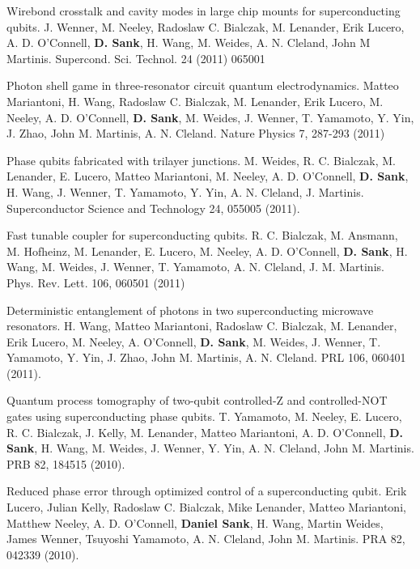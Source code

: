 \documentclass[margin=2cm,line]{res}
\newenvironment{list3}{
  \begin{list}{}{%
      \setlength{\itemsep}{0in}
      \setlength{\parsep}{0in} \setlength{\parskip}{0in}
      \setlength{\topsep}{0in} \setlength{\partopsep}{0in}
      \setlength{\leftmargin}{0.2in}}}{\end{list}}
\begin{document}
\begin{resume}
\begin{list3}
\item Wirebond crosstalk and cavity modes in large chip mounts for superconducting qubits. J. Wenner, M. Neeley, Radoslaw C. Bialczak, M. Lenander, Erik Lucero, A. D. O'Connell, \textbf{D. Sank}, H. Wang, M. Weides, A. N. Cleland, John M Martinis. Supercond. Sci. Technol. 24 (2011) 065001 \\

\item Photon shell game in three-resonator circuit quantum electrodynamics. Matteo Mariantoni, H. Wang, Radoslaw C. Bialczak, M. Lenander, Erik Lucero, M. Neeley, A. D. O'Connell, \textbf{D. Sank}, M. Weides, J. Wenner, T. Yamamoto, Y. Yin, J. Zhao, John M. Martinis, A. N. Cleland. Nature Physics 7, 287-293 (2011) \\

\item Phase qubits fabricated with trilayer junctions. M. Weides, R. C. Bialczak, M. Lenander, E. Lucero, Matteo Mariantoni, M. Neeley, A. D. O'Connell, \textbf{D. Sank}, H. Wang, J. Wenner, T. Yamamoto, Y. Yin, A. N. Cleland, J. Martinis. Superconductor Science and Technology 24, 055005 (2011). \\

\item Fast tunable coupler for superconducting qubits. R. C. Bialczak, M. Ansmann, M. Hofheinz, M. Lenander, E. Lucero, M. Neeley, A. D. O'Connell, \textbf{D. Sank}, H. Wang, M. Weides, J. Wenner, T. Yamamoto, A. N. Cleland, J. M. Martinis. Phys. Rev. Lett. 106, 060501 (2011) \\

\item Deterministic entanglement of photons in two superconducting microwave resonators. H. Wang, Matteo Mariantoni, Radoslaw C. Bialczak, M. Lenander, Erik Lucero, M. Neeley, A. O'Connell, \textbf{D. Sank}, M. Weides, J. Wenner, T. Yamamoto, Y. Yin, J. Zhao, John M. Martinis, A. N. Cleland. PRL 106, 060401 (2011). \\

\item Quantum process tomography of two-qubit controlled-Z and controlled-NOT gates using superconducting phase qubits. T. Yamamoto, M. Neeley, E. Lucero, R. C. Bialczak, J. Kelly, M. Lenander, Matteo Mariantoni, A. D. O'Connell, \textbf{D. Sank}, H. Wang, M. Weides, J. Wenner, Y. Yin, A. N. Cleland, John M. Martinis. PRB 82, 184515 (2010). \\

\item Reduced phase error through optimized control of a superconducting qubit. Erik Lucero, Julian Kelly, Radoslaw C. Bialczak, Mike Lenander, Matteo Mariantoni, Matthew Neeley, A. D. O'Connell, \textbf{Daniel Sank}, H. Wang, Martin Weides, James Wenner, Tsuyoshi Yamamoto, A. N. Cleland, John M. Martinis. PRA 82, 042339 (2010). \\


\end{list3}
\end{resume}
\end{document}
